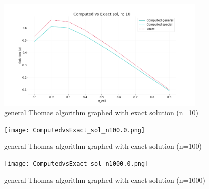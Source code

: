 \documentclass[%
oneside,                 %
final,                   %
10pt]{article}
\begin{document}
\begin{figure}[H]
\begin{center}
\graphicspath{ {ComputedvsExact/} }
\includegraphics[width=10cm]{ComputedvsExact_sol_n10.png}
\caption{general Thomas algorithm graphed with exact solution (n=10)}
\end{center}
\end{figure}

\begin{figure}[H]
\begin{center}
\graphicspath{ {ComputedvsExact/} }
\texttt{[image: ComputedvsExact\_sol\_n100.0.png]}
\caption{general Thomas algorithm graphed with exact solution (n=100)}
\end{center}
\end{figure}

\begin{figure}[H]
\begin{center}
\graphicspath{ {ComputedvsExact/} }
\texttt{[image: ComputedvsExact\_sol\_n1000.0.png]}
\caption{general Thomas algorithm graphed with exact solution (n=1000)}
\end{center}
\end{figure}
\end{document}
